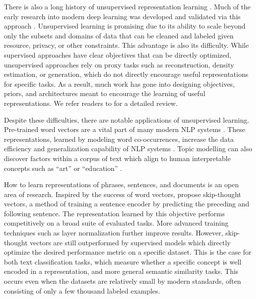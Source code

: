 There is also a long history of unsupervised representation learning \cite{olshausen1997sparse}. Much of the early research into modern deep learning was developed and validated via this approach \cite{hinton2006reducing} \cite{huang2007unsupervised} \cite{vincent2008extracting} \cite{coates2010analysis} \cite{le2013building}. Unsupervised learning is promising due to its ability to scale beyond only the subsets and domains of data that can be cleaned and labeled given resource, privacy, or other constraints. This advantage is also its difficulty. While supervised approaches have clear objectives that can be directly optimized, unsupervised approaches rely on proxy tasks such as reconstruction, density estimation, or generation, which do not directly encourage useful representations for specific tasks. As a result, much work has gone into designing objectives, priors, and architectures meant to encourage the learning of useful representations. We refer readers to \citet{goodfellow2016deep} for a detailed review.

Despite these difficulties, there are notable applications of unsupervised learning. Pre-trained word vectors are a vital part of many modern NLP systems \cite{collobert2011natural}. These representations, learned by modeling word co-occurrences, increase the data efficiency and generalization capability of NLP systems \cite{pennington2014glove} \cite{chen2014fast}. Topic modelling can also discover factors within a corpus of text which align to human interpretable concepts such as “art” or “education” \cite{blei2003latent}.

How to learn representations of phrases, sentences, and documents is an open area of research. Inspired by the success of word vectors, \citet{kiros2015skip} propose skip-thought vectors, a method of training a sentence encoder by predicting the preceding and following sentence. The representation learned by this objective performs competitively on a broad suite of evaluated tasks. More advanced training techniques such as layer normalization \cite{ba2016layer} further improve results. However, skip-thought vectors are still outperformed by supervised models which directly optimize the desired performance metric on a specific dataset. This is the case for both text classification tasks, which measure whether a specific concept is well encoded in a representation, and more general semantic similarity tasks. This occurs even when the datasets are relatively small by modern standards, often consisting of only a few thousand labeled examples. 

